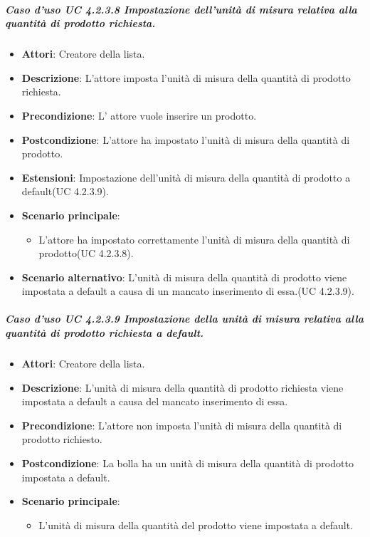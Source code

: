 	\subparagraph{Caso d'uso UC 4.2.3.8 Impostazione dell'unità di misura relativa alla quantità di prodotto richiesta.}
	\begin{itemize}
		\item\textbf{Attori}: Creatore della lista.
		\item\textbf{Descrizione}: L'attore imposta l'unità di misura della quantità di prodotto richiesta.
		\item\textbf{Precondizione}: L' attore vuole inserire un prodotto.
		\item\textbf{Postcondizione}: L'attore ha impostato l'unità di misura della quantità di prodotto.
		\item\textbf{Estensioni}: Impostazione dell'unità di misura della quantità di prodotto a default(UC 4.2.3.9).
		\item\textbf{Scenario principale}:
			\begin{itemize}
				\item L'attore ha impostato correttamente l'unità di misura della quantità di prodotto(UC 4.2.3.8). 
			\end{itemize}
		\item\textbf{Scenario alternativo}: L'unità di misura della quantità di prodotto viene impostata a default a causa di un mancato inserimento di essa.(UC 4.2.3.9).
		
	\end{itemize}
	
	
	
\subparagraph{Caso d'uso UC 4.2.3.9 Impostazione della unità di misura relativa alla quantità di prodotto richiesta a default.}
	\begin{itemize}
		\item\textbf{Attori}: Creatore della lista.
		\item\textbf{Descrizione}: L'unità di misura della quantità di prodotto richiesta viene impostata a default a causa del mancato inserimento di essa.
		\item\textbf{Precondizione}: L'attore non imposta l'unità di misura della quantità di prodotto richiesto.
		\item\textbf{Postcondizione}: La bolla ha un unità di misura della quantità di prodotto impostata a default.
		\item\textbf{Scenario principale}:
			\begin{itemize}
				\item L'unità di misura della quantità del prodotto viene impostata a default.
			\end{itemize}
		
\end{itemize}
	